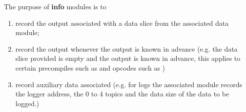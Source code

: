 The purpose of \textbf{info} modules is to
\begin{enumerate}
	\item 
		record the output associated with a data slice from the associated data module;
	\item 
		record the output whenever the output is known in advance 
		(e.g. the data slice provided is empty and the output is known in advance,
		this applies to certain precompiles such as
		\instEcrecover{}
		\instEcpairing{}
		\instShaTwo{}
		\instRipemd{}
		and opcodes such as )
	\item 
		record auxiliary data associated (e.g. for logs the associated  module records the logger address, the 0 to 4 topics and the data size of the data to be logged.)
\end{enumerate}
